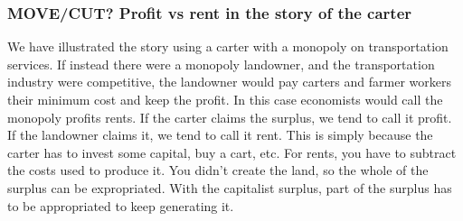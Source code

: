\subsubsection{MOVE/CUT? Profit vs rent in the story of the carter}
We have illustrated the story using a carter with a monopoly on transportation services. If instead there were a monopoly landowner, and the transportation industry were competitive, the landowner would pay carters and farmer workers their minimum cost and keep the profit. In this case economists would call the monopoly profits \glspl{rent}. If the carter claims the surplus, we tend to call it \gls{profit}. If the landowner claims it, we tend to call it \gls{rent}. This is simply because the carter has to invest some capital, buy a cart, etc. For rents, you have to subtract the costs used to produce it. You didn't create the land, so the whole of the surplus can be expropriated. With the capitalist surplus, part of the surplus has to be appropriated to keep generating it. %
 
